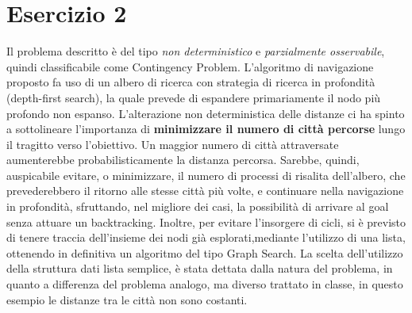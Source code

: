 	\section{Esercizio 2}
		\label{sec:es2}
		Il problema descritto è del tipo \emph{non deterministico} e \emph{parzialmente osservabile}, quindi classificabile come \textsf{Contingency Problem}. L'algoritmo di navigazione proposto fa uso di un albero di ricerca con strategia di ricerca in profondità (\textsf{depth-first search}), la quale prevede di espandere primariamente il nodo più profondo non espanso. L'alterazione non deterministica delle distanze ci ha spinto a sottolineare l'importanza di \textbf{minimizzare il numero di città percorse} lungo il tragitto verso l'obiettivo. Un maggior numero di città attraversate aumenterebbe probabilisticamente la distanza percorsa. Sarebbe, quindi, auspicabile evitare, o minimizzare, il numero di processi di risalita dell'albero, che prevederebbero il ritorno alle stesse città più volte, e continuare nella navigazione in profondità, sfruttando, nel migliore dei casi, la possibilità di arrivare al \textsf{goal} senza attuare un \textsf{backtracking}. Inoltre, per evitare l'insorgere di cicli, si è previsto di tenere traccia dell'insieme dei nodi già esplorati,mediante l'utilizzo di una lista, ottenendo in definitiva un algoritmo del tipo \textsf{Graph Search}.
La scelta dell'utilizzo della struttura dati lista semplice, è stata dettata dalla natura del problema, in quanto a differenza del problema analogo, ma diverso trattato in classe, in questo esempio le distanze tra le città non sono costanti.
